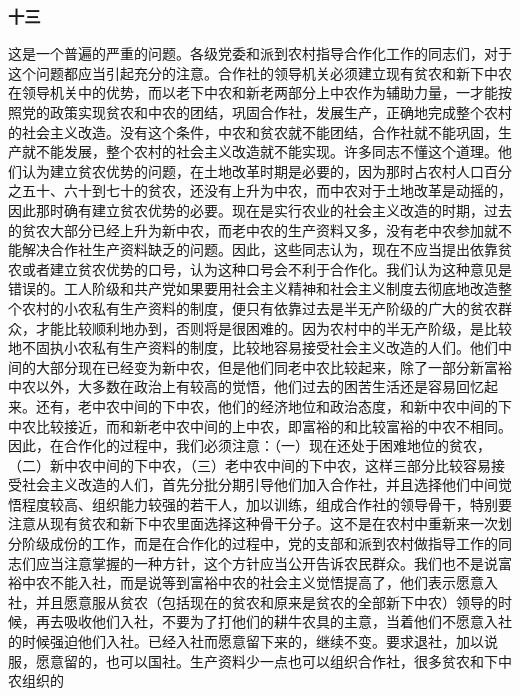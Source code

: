 \documentclass[cn,11pt,chinese]{elegantbook}
\def\myformat#1{\hfil\hfil #1}
\begin{document}
\subsubsection*{\myformat{十三}}
这是一个普遍的严重的问题。各级党委和派到农村指导合作化工作的同志们，对于这个问题都应当引起充分的注意。合作社的领导机关必须建立现有贫农和新下中农在领导机关中的优势，而以老下中农和新老两部分上中农作为辅助力量，一才能按照党的政策实现贫农和中农的团结，巩固合作社，发展生产，正确地完成整个农村的社会主义改造。没有这个条件，中农和贫农就不能团结，合作社就不能巩固，生产就不能发展，整个农村的社会主义改造就不能实现。许多同志不懂这个道理。他们认为建立贫农优势的问题，在土地改革时期是必要的，因为那时占农村人口百分之五十、六十到七十的贫农，还没有上升为中农，而中农对于土地改革是动摇的，因此那时确有建立贫农优势的必要。现在是实行农业的社会主义改造的时期，过去的贫农大部分已经上升为新中农，而老中农的生产资料又多，没有老中农参加就不能解决合作社生产资料缺乏的问题。因此，这些同志认为，现在不应当提出依靠贫农或者建立贫农优势的口号，认为这种口号会不利于合作化。我们认为这种意见是错误的。工人阶级和共产党如果要用社会主义精神和社会主义制度去彻底地改造整个农村的小农私有生产资料的制度，便只有依靠过去是半无产阶级的广大的贫农群众，才能比较顺利地办到，否则将是很困难的。因为农村中的半无产阶级，是比较地不固执小农私有生产资料的制度，比较地容易接受社会主义改造的人们。他们中间的大部分现在已经变为新中农，但是他们同老中农比较起来，除了一部分新富裕中农以外，大多数在政治上有较高的觉悟，他们过去的困苦生活还是容易回忆起来。还有，老中农中间的下中农，他们的经济地位和政治态度，和新中农中间的下中农比较接近，而和新老中农中间的上中农，即富裕的和比较富裕的中农不相同。因此，在合作化的过程中，我们必须注意：（一）现在还处于困难地位的贫农，（二）新中农中间的下中农，（三）老中农中间的下中农，这样三部分比较容易接受社会主义改造的人们，首先分批分期引导他们加入合作社，并且选择他们中间觉悟程度较高、组织能力较强的若干人，加以训练，组成合作社的领导骨干，特别要注意从现有贫农和新下中农里面选择这种骨干分子。这不是在农村中重新来一次划分阶级成份的工作，而是在合作化的过程中，党的支部和派到农村做指导工作的同志们应当注意掌握的一种方针，这个方针应当公开告诉农民群众。我们也不是说富裕中农不能入社，而是说等到富裕中农的社会主义觉悟提高了，他们表示愿意入社，并且愿意服从贫农（包括现在的贫农和原来是贫农的全部新下中农）领导的时候，再去吸收他们入社，不要为了打他们的耕牛农具的主意，当着他们不愿意入社的时候强迫他们入社。已经入社而愿意留下来的，继续不变。要求退社，加以说服，愿意留的，也可以国社。生产资料少一点也可以组织合作社，很多贫农和下中农组织的
\end{document}

